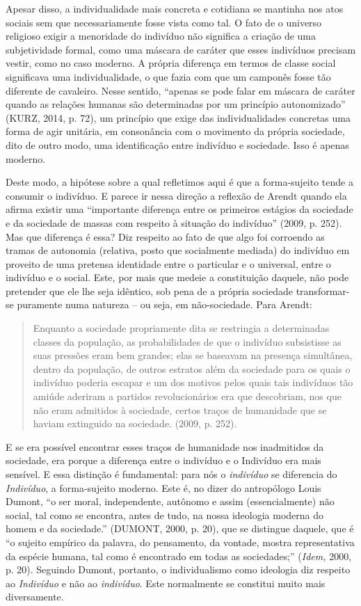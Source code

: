 Apesar disso, a individualidade mais concreta e cotidiana se mantinha
nos atos sociais sem que necessariamente fosse vista como tal. O fato de
o universo religioso exigir a menoridade do indivíduo não significa a
criação de uma subjetividade formal, como uma máscara de caráter que
esses indivíduos precisam vestir, como no caso moderno. A própria
diferença em termos de classe social significava uma individualidade, o
que fazia com que um camponês fosse tão diferente de cavaleiro. Nesse
sentido, ``apenas se pode falar em máscara de caráter quando as relações
humanas são determinadas por um princípio autonomizado'' (KURZ, 2014, p.
72), um princípio que exige das individualidades concretas uma forma de
agir unitária, em consonância com o movimento da própria sociedade, dito
de outro modo, uma identificação entre indivíduo e sociedade. Isso é
apenas moderno.

Deste modo, a hipótese sobre a qual refletimos aqui é que a
forma-sujeito tende a consumir o indivíduo. E parece ir nessa direção a
reflexão de Arendt quando ela afirma existir uma ``importante diferença
entre os primeiros estágios da sociedade e da sociedade de massas com
respeito à situação do indivíduo'' (2009, p. 252). Mas que diferença é
essa? Diz respeito ao fato de que algo foi corroendo as tramas de
autonomia (relativa, posto que socialmente mediada) do indivíduo em
proveito de uma pretensa identidade entre o particular e o universal,
entre o indivíduo e o social. Este, por mais que medeie a constituição
daquele, não pode pretender que ele lhe seja idêntico, sob pena de a
própria sociedade transformar-se puramente numa natureza -- ou seja, em
não-sociedade. Para Arendt:

\begin{quote}
Enquanto a sociedade propriamente dita se restringia a determinadas
classes da população, as probabilidades de que o indivíduo subsistisse
as suas pressões eram bem grandes; elas se baseavam na presença
simultânea, dentro da população, de outros estratos além da sociedade
para os quais o indivíduo poderia escapar e um dos motivos pelos quais
tais indivíduos tão amiúde aderiram a partidos revolucionários era que
descobriam, nos que não eram admitidos à sociedade, certos traços de
humanidade que se haviam extinguido na sociedade. (2009, p. 252).
\end{quote}

E se era possível encontrar esses traços de humanidade nos inadmitidos
da sociedade, era porque a diferença entre o indivíduo e o Indivíduo era
mais sensível. E essa distinção é fundamental: para nós o
\emph{indivíduo} se diferencia do \emph{Indivíduo}, a forma-sujeito
moderno. Este é, no dizer do antropólogo Louis Dumont, ``o ser moral,
independente, autônomo e assim (essencialmente) não social, tal como se
encontra, antes de tudo, na nossa ideologia moderna do homem e da
sociedade.'' (DUMONT, 2000, p. 20), que se distingue daquele, que é ``o
sujeito empírico da palavra, do pensamento, da vontade, mostra
representativa da espécie humana, tal como é encontrado em todas as
sociedades;'' (\emph{Idem,} 2000, p. 20). Seguindo Dumont, portanto, o
individualismo como ideologia diz respeito ao \emph{Indivíduo} e não ao
\emph{indivíduo}. Este normalmente se constitui muito mais diversamente.

